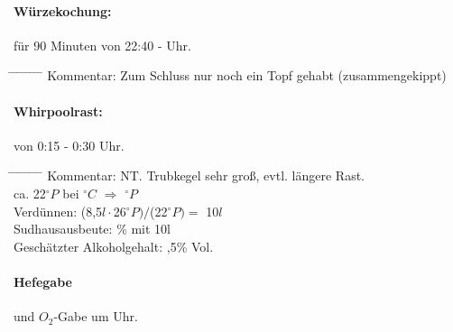 \documentclass[12pt,oneside,a4paper]{scrartcl}
\begin{document}
{\paragraph{Würzekochung:} für 90 Minuten von 22:40 - Uhr.
	\begin{tabbing}
		\hspace{1cm} \= \hspace{1cm} \= \hspace{1cm} \= \hspace{1cm} \= \hspace{1cm} \= \hspace{1cm} \= \hspace{1cm} \= \hspace{1cm} \= \kill
		\> Kommentar: \> \> \> Zum Schluss nur noch ein Topf gehabt (zusammengekippt)
	\end{tabbing}
%
\paragraph{Whirpoolrast:} von 0:15 - 0:30 Uhr.
	\begin{tabbing}
		\hspace{1cm} \= \hspace{1cm} \= \hspace{1cm} \= \hspace{1cm} \= \hspace{1cm} \= \hspace{1cm} \= \hspace{1cm} \= \hspace{1cm} \= \kill
		\> Kommentar: \>\>\> NT. Trubkegel sehr groß, evtl. längere Rast.\\
		\> \> \> ca. 22$^\circ P$ \> \> bei $^\circ C$ \> $\Rightarrow$ $^\circ P$\\
		\> \> Verdünnen: \> \> \> \> \> (8,5$l \cdot$26$ ^\circ P)/$(22$^\circ P)=$ 10$l$\\
		\> \> Sudhausausbeute: \> \> \> \> \% mit 10l\\
		\> \> Geschätzter Alkoholgehalt: \> \> \> \> ,5\% Vol.
	\end{tabbing}
%
\paragraph{Hefegabe} und $O_2$-Gabe um \hspace{2.5cm} Uhr.
%
}
\end{document}
